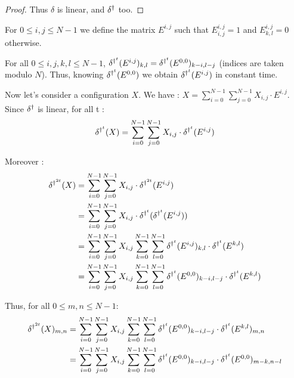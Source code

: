 \begin{proof}
Thus $\delta$ is linear, and $\delta^{\dag}$ too.
\end{proof}


\begin{defi}
 For $0 \leq i,j \leq N-1$ we define the matrix $E^{i,j}$ such that $E^{i,j}_{i,j} = 1$ and $E^{i,j}_{k,l} = 0$ otherwise.
\end{defi}

\begin{lemma}
 For all $0 \leq i, j, k, l \leq N-1$, $\delta^{\dag^t}(E^{i,j})_{k,l} = \delta^{\dag^t}(E^{0,0})_{k-i,l-j}$ (indices are taken modulo $N$). Thus, knowing $\delta^{\dag^t}(E^{0,0})$ we obtain $\delta^{\dag^t}(E^{i,j})$ in constant time.
\end{lemma}

Now let's consider a configuration $X$. We have : $X = \sum_{i=0}^{N-1} \sum_{j=0}^{N-1} X_{i,j} \cdot E^{i,j}$. Since $\delta^{\dag}$ is linear, for all t : 
\[ \delta^{\dag^t} (X) = \sum_{i=0}^{N-1} \sum_{j=0}^{N-1} X_{i,j} \cdot \delta^{\dag^t} (E^{i,j})\]
 
Moreover : 
\begin{equation}
 \label{expanddelta}
 \begin{split}
    \delta^{\dag^{2t}} (X) & = \sum_{i=0}^{N-1} \sum_{j=0}^{N-1} X_{i,j} \cdot \delta^{\dag^{2t}} (E^{i,j}) \\
		  & = \sum_{i=0}^{N-1} \sum_{j=0}^{N-1} X_{i,j} \cdot \delta^{\dag^t}(\delta^{\dag^t} (E^{i,j})) \\
		  & = \sum_{i=0}^{N-1} \sum_{j=0}^{N-1} X_{i,j} \sum_{k=0}^{N-1} \sum_{l=0}^{N-1} \delta^{\dag^t} (E^{i,j})_{k,l} \cdot \delta^{\dag^t} (E^{k,l}) \\
		  & = \sum_{i=0}^{N-1} \sum_{j=0}^{N-1} X_{i,j} \sum_{k=0}^{N-1} \sum_{l=0}^{N-1} \delta^{\dag^t} (E^{0,0})_{k-i,l-j} \cdot \delta^{\dag^t} (E^{k,l})
 \end{split}
\end{equation}

Thus, for all $0 \leq m, n \leq N-1$:
\begin{equation}
 \label{aveq}
 \begin{split}
    \delta^{\dag^{2t}} (X)_{m,n} & = \sum_{i=0}^{N-1} \sum_{j=0}^{N-1} X_{i,j} \sum_{k=0}^{N-1} \sum_{l=0}^{N-1} \delta^{\dag^t} (E^{0,0})_{k-i,l-j} \cdot \delta^{\dag^t} (E^{k,l})_{m,n} \\
                        & = \sum_{i=0}^{N-1} \sum_{j=0}^{N-1} X_{i,j} \sum_{k=0}^{N-1} \sum_{l=0}^{N-1} \delta^{\dag^t} (E^{0,0})_{k-i,l-j} \cdot \delta^{\dag^t} (E^{0,0})_{m-k,n-l}
 \end{split}
\end{equation}

